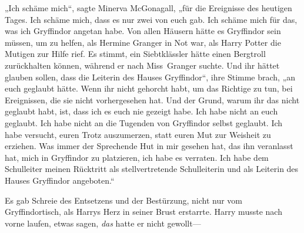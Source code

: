 „Ich schäme mich“, sagte Minerva McGonagall, „für die Ereignisse des heutigen Tages. Ich schäme mich, dass es nur zwei von euch gab. Ich schäme mich für das, was ich Gryffindor angetan habe. Von allen Häusern hätte es Gryffindor sein müssen, um zu helfen, als Hermine Granger in Not war, als Harry Potter die Mutigen zur Hilfe rief. Es stimmt, ein Siebtklässler hätte einen Bergtroll zurückhalten können, während er nach Miss~Granger suchte. Und ihr hättet glauben sollen, dass die Leiterin des Hauses Gryffindor“, ihre Stimme brach, „an euch geglaubt hätte. Wenn ihr nicht gehorcht habt, um das Richtige zu tun, bei Ereignissen, die sie nicht vorhergesehen hat. Und der Grund, warum ihr das nicht geglaubt habt, ist, dass ich es euch nie gezeigt habe. Ich habe nicht an euch geglaubt. Ich habe nicht an die Tugenden von Gryffindor selbst geglaubt. Ich habe versucht, euren Trotz auszumerzen, statt euren Mut zur Weisheit zu erziehen. Was immer der Sprechende Hut in mir gesehen hat, das ihn veranlasst hat, mich in Gryffindor zu platzieren, ich habe es verraten. Ich habe dem Schulleiter meinen Rücktritt als stellvertretende Schulleiterin und als Leiterin des Hauses Gryffindor angeboten.“

\later

Es gab Schreie des Entsetzens und der Bestürzung, nicht nur vom Gryffindortisch, als Harrys Herz in seiner Brust erstarrte. Harry musste nach vorne laufen, etwas sagen, \emph{das} hatte er nicht gewollt—

